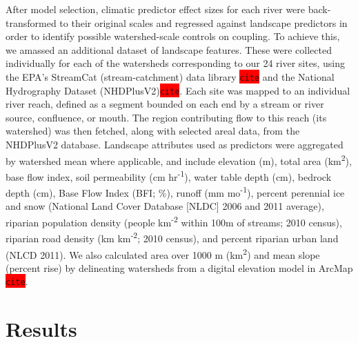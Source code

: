 \documentclass{article}
\begin{document}
After model selection, climatic predictor effect sizes for each river were back-transformed to their original scales and regressed against landscape predictors in order to identify possible watershed-scale controls on coupling. To achieve this, we amassed an additional dataset of landscape features. These were collected individually for each of the watersheds corresponding to our 24 river sites, using the EPA's StreamCat (stream-catchment) data library \colorbox{red}{\lstinline{cite}} and the National Hydrography Dataset (NHDPlusV2)\colorbox{red}{\lstinline{cite}}. Each site was mapped to an individual river reach, defined as a segment bounded on each end by a stream or river source, confluence, or mouth. The region contributing flow to this reach (its watershed) was then fetched, along with selected areal data, from the NHDPlusV2 database. Landscape attributes used as predictors were aggregated by watershed mean where applicable, and include elevation (m), total area (km\textsuperscript{2}), base flow index, soil permeability (cm hr\textsuperscript{-1}), water table depth (cm), bedrock depth (cm), Base Flow Index (BFI; \%), runoff (mm mo\textsuperscript{-1}), percent perennial ice and snow (National Land Cover Database [NLDC] 2006 and 2011 average), riparian population density (people km\textsuperscript{-2} within 100m of streams; 2010 census), riparian road density (km km\textsuperscript{-2}; 2010 census), and percent riparian urban land (NLCD 2011). We also calculated area over 1000 m (km\textsuperscript{2}) and mean slope (percent rise) by delineating watersheds from a digital elevation model in ArcMap \colorbox{red}{\lstinline{cite}}.

\section*{Results}

\end{document}
